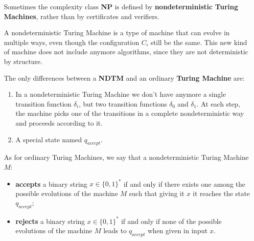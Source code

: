 Sometimes the complexity class \textbf{NP} is defined by \textbf{nondeterministic Turing Machines}, rather than by certificates and verifiers. \vspace{7pt}

A nondeterministic Turing Machine is a type of machine that can evolve in multiple ways, even though the configuration $C_i$ still be the same. This new 
kind of machine does not include anymore algorithms, since they are not deterministic by structure. \vspace{7pt}

The only differences between a \textbf{NDTM} and an ordinary \textbf{Turing Machine} are:
\begin{enumerate}
    \item In a nondeterministic Turing Machine we don't have anymore a single transition function $\delta_i$, but two transition functions $\delta_0$ and $\delta_1$. At each step, the machine picks one of the transitions in a complete nondeterministic way and proceeds according to it.
    \item A special state named $q_{accept}$.
\end{enumerate}
As for ordinary Turing Machines, we say that a nondeterministic Turing Machine $M$:
\begin{itemize}
    \renewcommand{\labelitemi}{-}
    \item \textbf{accepts} a binary string $x \in \{0,1\}^*$ if and only if there exists one among the possible evolutions of the machine $M$ such that giving it $x$ it reaches the state $q_{accept}$;
    \item \textbf{rejects} a binary string $x \in \{0,1\}^*$ if and only if none of the possible evolutions of the machine $M$ leads to $q_{accept}$ when given in input $x$.
\end{itemize}